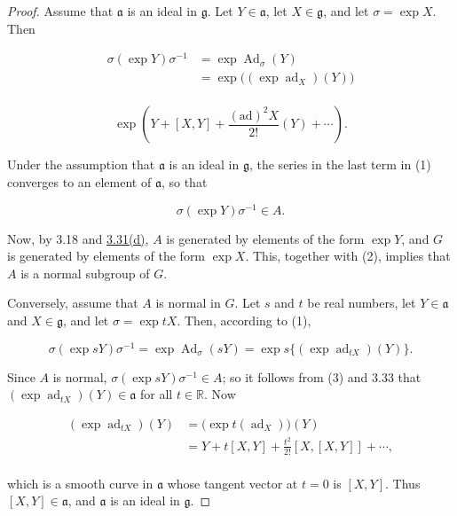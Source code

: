 \begin{proof}
Assume that $\mathfrak{a}$ is an ideal in $\mathfrak{g}$. Let  $ Y\in\mathfrak{a} $, let  $ X \in \mathfrak{g} $, and let  $ \sigma = \exp X $. Then

\begin{equation}
\tag{1}\label{eq:3.48:1}
\begin{aligned}\sigma(\exp Y)\sigma^{-1}&=\exp\operatorname{Ad}_{\sigma}(Y)\\&=\exp\bigl((\exp\operatorname{ad}_{X})(Y)\bigr)\\ \end{aligned}
\end{equation}

\[
\exp\left(Y+[X,Y]+\frac{(\mathrm{ad})^{2}X}{2!}(Y)+\cdots\right).
\]

Under the assumption that $\mathfrak{a}$ is an ideal in $\mathfrak{g}$, the series in the last term in (1) converges to an element of $\mathfrak{a}$, so that

\begin{equation}
\tag{2}\label{eq:3.48:2}
\sigma(\exp Y)\sigma^{-1}\in A.
\end{equation}

Now, by 3.18 and \hyperref[thm:3.31]{3.31(d)}, $A$ is generated by elements of the form $\exp Y$, and $G$ is generated by elements of the form $\exp X$. This, together with (2), implies that $A$ is a normal subgroup of $G$.

Conversely, assume that $A$ is normal in $G$. Let $s$ and $t$ be real numbers, let $Y\in\mathfrak{a}$ and $X\in\mathfrak{g}$, and let $\sigma=\exp tX$. Then, according to (1),

\begin{equation}
\tag{3}\label{eq:3.48:3}
\sigma(\exp sY)\sigma^{-1}=\exp\operatorname{Ad}_{\sigma}(sY)=\exp s\big\{(\exp\operatorname{ad}_{tX})(Y)\big\}.
\end{equation}

Since $A$ is normal, $\sigma(\exp sY)\sigma^{-1}\in A$; so it follows from (3) and 3.33 that $(\exp\operatorname{ad}_{tX})(Y)\in\mathfrak{a}$ for all $t\in\mathbb{R}$. Now

\[
\begin{aligned}{(\exp\operatorname{ad}_{t X})(Y)}&{{}=\big(\exp t(\operatorname{ad}_{X})\big)(Y)}\\ {}&{{}=Y+t[X,Y]+\frac{t^{2}}{2!}\left[X,[X,Y]\right]+\cdots,}\\ \end{aligned}
\]

which is a smooth curve in $\mathfrak{a}$ whose tangent vector at $t=0$ is $[X,Y]$. Thus $[X,Y]\in\mathfrak{a}$, and $\mathfrak{a}$ is an ideal in $\mathfrak{g}$.

\end{proof}

